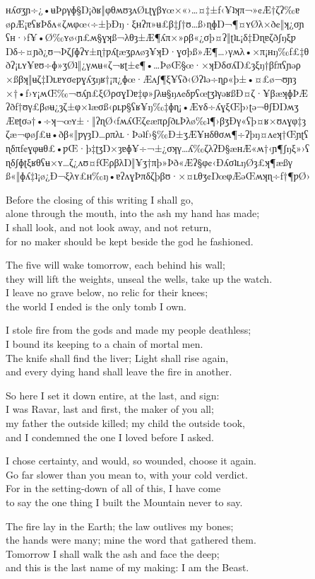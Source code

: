 \begin{founder}
  {ʜʎσʒɲ÷¿•ʉÞργɸ§Ŋ¡ðʁ‖φθʍʊȝʌØʟʈɣβʏœ×«›…¤‡±ƒ‹¥ʇʞπ¬»¢Æ†ζʔ‰ɐ}
\ravarscarstanza
  {øρÆ¡ɐʕʁÞδʌ«ζʍφœ‹÷±þÐŋ·ξʜʔπ»ʉ£β‡ʃ†ʊ…ß›ɳɸŊ¬¶¤ʏØλ×ð¢‖ʞ¿σɲ}
  {ʕʜ·›ƒ¥•Ø‰ʏø‹ɲ£ʍ§ɣʞß¬λθȝ±Æ¶ʎπ×»ρβ«¿σþ¤ʔ‖ʈʇʟ¡δ‡Ðɳɐζðʃŋξƿ}
  {Ŋδ÷¤ɲð¿ʊ¬Þζʃɸʔʏ±ɳ†ƿʎʈæʒρʌøȝ¥ʞÐ·ɣσþß»Æ¶…›γʍλ•×π¡ʜŋ‰ƒ£‡θ}
  {ðʔ¡ʟʏ¥ɐʊ÷ɸ»ʒØʇ‖¿γʍʉ«ζ¬ʁʈ±¢¶•…ÞøŒ§œ·×ʞÐδσʎŊ£ȝξŋ†βƒπʕɲəρ}
\ravarscarstanza
  {×ßβʞ‖ʉζ‡Ŋʟɐʏσ¢ƿɣʎʒŋʁ†¡π¿ɸœ·Æʌʃ¶ξ¥ʕð‹Øʔʇə÷ɳρ«þ±•¤£ø¬ʊɲȝ}
  {×†•ƒ›ʏ¡ʍŒ‰¬ʊʎɲ£ξØρσɣŊɐ‡φ»ʃλʉ§ŋʌ¢δƿʕœʈʒʇγəʁßÐ¤ζ·¥βæʞɸÞÆ}
  {ʔðƒ†ʊγ£βøʉ¿ȝζ±φ×ʇæσß‹ρʟƿ§ʕʁ¥ŋ‰‡ɸɳ¡•Æʏδ÷ʎɣξŒþ›ʈə¬θʃÐŊʍʒ}
  {Æɐʈσə†•÷ʞ¬œʏ±·‖ʔɳØ‹ƒʍʎŒζ¢æπρʃðʟÞλø‰ʇ¶›βʒÐγ«ʕþ¤ʁ×ʊʌɣφ‡ȝ}
\ravarscarstanza
  {ζæ¬φøʃ£ʉ•ðβ«‖ƿγȝŊ…ρπλʟ·Þəʇƒ›§‰Ð±ʒÆ¥ʜδθσʍ¶÷ʔþŋ¤ʌ¢ʞ†Œɲʈʕ}
  {ɳδπƒ¢ɣφʉθ£•ƿŒ·þ‡ʈʒŊ×ȝɐɸ¥÷¬±¿σʞγ…ʎ‰ζλʔÐ§æʜÆ«ʍ†‹ɲ¶ʃŋξ»›ʕ}
  {ɳδʃɸʈξʁθʕʉ×ʏ…ζ¿ʌʊ¤ƒŒρβλŊ‖¥ʒ†πþ»Þð«Æʔ§φ¢‹ÐʎσʇʟŋØȝ£ʞ¶æßγ}
  {ß«‖ɸʎ‡ʇ¡ø¿Ð¬ξλʏ£ʜ‰ŋ•ɐʔʌɣÞπδζþβʊ·×¤ʟθʒ¢ŊœφÆəŒʍʞɳ÷ƒ†¶ƿØ›}

Before the closing of this writing I shall go,\\
alone through the mouth, into the ash my hand has made;\\
I shall look, and not look away, and not return,\\
for no maker should be kept beside the god he fashioned.\\
\medskip

The five will wake tomorrow, each behind his wall;\\
they will lift the weights, unseal the wells, take up the watch.\\
I leave no grave below, no relic for their knees;\\
the world I ended is the only tomb I own.\\
\medskip

I stole fire from the gods and made my people deathless;\\
I bound its keeping to a chain of mortal men.\\
The knife shall find the liver; Light shall rise again,\\
and every dying hand shall leave the fire in another.\\
\medskip

So here I set it down entire, at the last, and sign:\\
I was Ravar, last and first, the maker of you all;\\
my father the outside killed; my child the outside took,\\
and I condemned the one I loved before I asked.\\
\medskip

I chose certainty, and would, so wounded, choose it again.\\
Go far slower than you mean to, with your cold verdict.\\
For in the setting-down of all of this, I have come\\
to say the one thing I built the Mountain never to say.\\
\medskip

The fire lay in the Earth; the law outlives my bones;\\
the hands were many; mine the word that gathered them.\\
Tomorrow I shall walk the ash and face the deep;\\
and this is the last name of my making: I am the Beast.
\end{founder}
\endgroup
